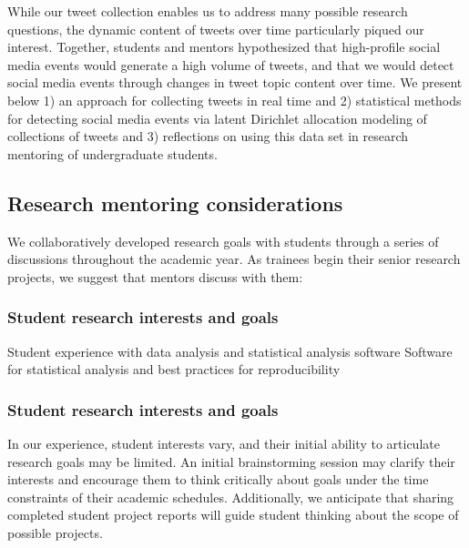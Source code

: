\documentclass[
]{article}
\begin{document}
While our tweet collection enables us to address many possible research
questions, the dynamic content of tweets over time particularly piqued
our interest. Together, students and mentors hypothesized that
high-profile social media events would generate a high volume of tweets,
and that we would detect social media events through changes in tweet
topic content over time. We present below 1) an approach for collecting
tweets in real time and 2) statistical methods for detecting social
media events via latent Dirichlet allocation modeling of collections of
tweets and 3) reflections on using this data set in research mentoring
of undergraduate students.

\hypertarget{research-mentoring-considerations}{%
\subsection{Research mentoring
considerations}\label{research-mentoring-considerations}}

We collaboratively developed research goals with students through a
series of discussions throughout the academic year. As trainees begin
their senior research projects, we suggest that mentors discuss with
them:

\hypertarget{student-research-interests-and-goals}{%
\subsubsection{Student research interests and
goals}\label{student-research-interests-and-goals}}

Student experience with data analysis and statistical analysis software
Software for statistical analysis and best practices for reproducibility

\hypertarget{student-research-interests-and-goals-1}{%
\subsubsection{Student research interests and
goals}\label{student-research-interests-and-goals-1}}

In our experience, student interests vary, and their initial ability to
articulate research goals may be limited. An initial brainstorming
session may clarify their interests and encourage them to think
critically about goals under the time constraints of their academic
schedules. Additionally, we anticipate that sharing completed student
project reports will guide student thinking about the scope of possible
projects.
\end{document}
